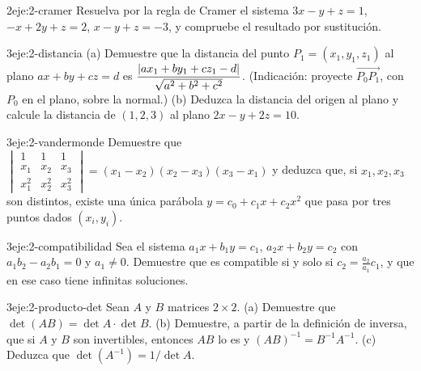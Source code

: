 \begin{ejercicio}{2}{eje:2-cramer}
Resuelva por la regla de Cramer el sistema $3x-y+z=1$, $-x+2y+z=2$, $x-y+z=-3$, y compruebe el resultado por sustitución.
\end{ejercicio}

\begin{ejercicio}{3}{eje:2-distancia}
(a) Demuestre que la distancia del punto $P_1=(x_1,y_1,z_1)$ al plano $ax+by+cz=d$ es $\dfrac{\lvert ax_1+by_1+cz_1-d\rvert}{\sqrt{a^2+b^2+c^2}}$. (Indicación: proyecte $\overrightarrow{P_0P_1}$, con $P_0$ en el plano, sobre la normal.) (b) Deduzca la distancia del origen al plano y calcule la distancia de $(1,2,3)$ al plano $2x-y+2z=10$.
\end{ejercicio}

\begin{ejercicio}{3}{eje:2-vandermonde}
Demuestre que
$\begin{vmatrix}1&1&1\\x_1&x_2&x_3\\x_1^2&x_2^2&x_3^2\end{vmatrix}=(x_1-x_2)(x_2-x_3)(x_3-x_1)$
y deduzca que, si $x_1,x_2,x_3$ son distintos, existe una única parábola $y=c_0+c_1x+c_2x^2$ que pasa por tres puntos dados $(x_i,y_i)$.
\end{ejercicio}

\begin{ejercicio}{3}{eje:2-compatibilidad}
Sea el sistema $a_1x+b_1y=c_1$, $a_2x+b_2y=c_2$ con $a_1b_2-a_2b_1=0$ y $a_1\neq0$. Demuestre que es compatible si y solo si $c_2=\frac{a_2}{a_1}c_1$, y que en ese caso tiene infinitas soluciones.
\end{ejercicio}

\begin{ejercicio}{3}{eje:2-producto-det}
Sean $A$ y $B$ matrices $2\times2$. (a) Demuestre que $\det(AB)=\det A\cdot\det B$. (b) Demuestre, a partir de la definición de inversa, que si $A$ y $B$ son invertibles, entonces $AB$ lo es y $(AB)^{-1}=B^{-1}A^{-1}$. (c) Deduzca que $\det(A^{-1})=1/\det A$.
\end{ejercicio}
